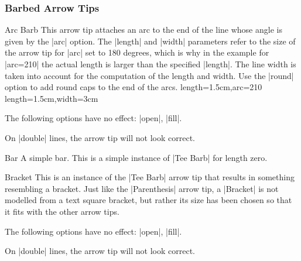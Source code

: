 \subsubsection{Barbed Arrow Tips}

\begin{arrowtip}{Arc Barb}
  {
    This arrow tip attaches an arc to the end of the line whose angle
    is given by the |arc| option. The
    |length| and |width| parameters refer to the size of the arrow tip
    for |arc| set to 180 degrees, which is why in the example for 
    |arc=210| the actual length is larger than the specified
    |length|. The line width is taken into account 
    for the computation  of the length and width. Use the |round|
    option to add round caps to the end of the arcs.
  }
  {length=1.5cm,arc=210}
  {length=1.5cm,width=3cm}
  
  \begin{arrowexamples}
    \arrowexample[]
    \arrowexampledup[sep]
    \arrowexampledupdot[sep]
    \arrowexample[arc=120]
    \arrowexample[arc=270]
    \arrowexample[length=2pt]
    \arrowexample[length=2pt,width=5pt]
    \arrowexample[line width=2pt]
    \arrowexample[reversed]
    \arrowexample[round]
    \arrowexample[slant=.3]
    \arrowexample[left]
    \arrowexample[right]
    \arrowexample[red]
  \end{arrowexamples}
  The following options have no effect: |open|, |fill|.

  On |double| lines, the arrow tip will not look correct.
\end{arrowtip}


\begin{arrowtipsimple}{Bar}
  A simple bar. This is a simple instance of |Tee Barb| for length zero.
\end{arrowtipsimple}

\begin{arrowtip}{Bracket}
  {
    This is an instance of the |Tee Barb| arrow tip that results in
    something resembling a bracket. Just like the |Parenthesis| arrow
    tip, a |Bracket| is not modelled from a text square bracket, but
    rather its size has been chosen so that it fits with the other
    arrow tips.
  }
  {}
  {}
  
  \begin{arrowexamples}
    \arrowexample[]
    \arrowexampledup[sep]
    \arrowexampledupdot[sep]
    \arrowexample[reversed]
    \arrowexample[round]
    \arrowexample[slant=.3]
    \arrowexample[left]
    \arrowexample[right]
    \arrowexample[red]
  \end{arrowexamples}
  The following options have no effect: |open|, |fill|.

  On |double| lines, the arrow tip will not look correct.
\end{arrowtip}

